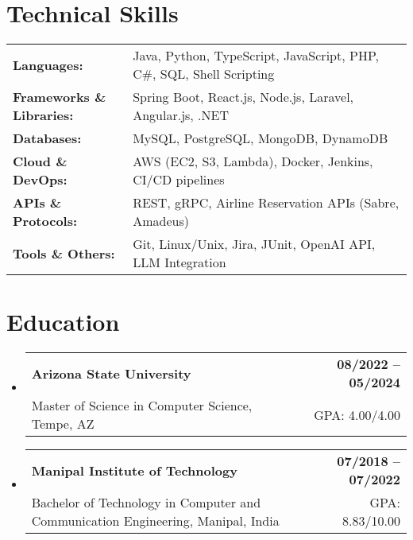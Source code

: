\documentclass[letterpaper,11pt]{article}
\makeatletter
\newcommand{\educationSubheading}[4]{
  \vspace{-2pt}\item
    \begin{tabular*}{1.0\textwidth}[t]{l@{\extracolsep{\fill}}r}
      \textbf{\small #1} & \textbf{\small #2} \\
      {\small#3} & {\small #4} \\
    \end{tabular*}\vspace{-7pt}
}
\newcommand{\resumeSubHeadingListStart}{\begin{itemize}[leftmargin=0pt, label={}]}
\newcommand{\resumeSubHeadingListEnd}{\end{itemize}}
\makeatother
\begin{document}
\section{Technical Skills}
        \vspace{-14pt}
        \begin{table}[h]
            \footnotesize
            \begin{tabular}{p{0.3\linewidth} p{0.7\linewidth}}
                \textbf{Languages:} & Java, Python, TypeScript, JavaScript, PHP, C\#, SQL, Shell Scripting \\
                \textbf{Frameworks \& Libraries:} & Spring Boot, React.js, Node.js, Laravel, Angular.js, .NET \\
                \textbf{Databases:} & MySQL, PostgreSQL, MongoDB, DynamoDB \\
                \textbf{Cloud \& DevOps:} & AWS (EC2, S3, Lambda), Docker, Jenkins, CI/CD pipelines \\
                \textbf{APIs \& Protocols:} & REST, gRPC, Airline Reservation APIs (Sabre, Amadeus) \\
                \textbf{Tools \& Others:} & Git, Linux/Unix, Jira, JUnit, OpenAI API, LLM Integration \\
            \end{tabular}
        \end{table}

 \vspace{-15pt}

\section{Education}
  \resumeSubHeadingListStart
    \educationSubheading
      {Arizona State University}{08/2022 -- 05/2024}
      {Master of Science in Computer Science, Tempe, AZ}{GPA: 4.00/4.00}

    \educationSubheading
      {Manipal Institute of Technology}{07/2018 -- 07/2022}
      {Bachelor of Technology in Computer and Communication Engineering, Manipal, India}{GPA: 8.83/10.00}
  \resumeSubHeadingListEnd
\end{document}
